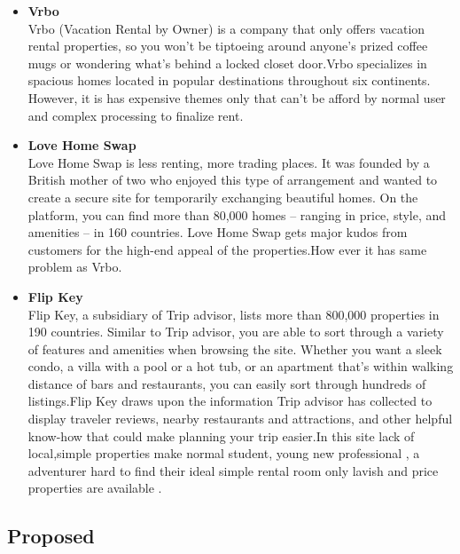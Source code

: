 \begin{itemize}
    \item \textbf{Vrbo}\\
    Vrbo (Vacation Rental by Owner) is a company that only offers vacation rental properties, so you won’t be tiptoeing around anyone’s prized coffee mugs or wondering what’s behind a locked closet door.Vrbo specializes in spacious homes located in popular destinations throughout six continents. However, it is has expensive themes only that can't be afford by normal user and complex processing to finalize rent.
    \item \textbf{Love Home Swap}\\
  Love Home Swap is less renting, more trading places. It was founded by a British mother of two who enjoyed this type of arrangement and wanted to create a secure site for temporarily exchanging beautiful homes. On the platform, you can find more than 80,000 homes – ranging in price, style, and amenities – in 160 countries. Love Home Swap gets major kudos from customers for the high-end appeal of the properties.How ever it has same problem as Vrbo.\\

    \item \textbf{Flip Key}\\
    Flip Key, a subsidiary of Trip advisor, lists more than 800,000 properties in 190 countries. Similar to Trip advisor, you are able to sort through a variety of features and amenities when browsing the site. Whether you want a sleek condo, a villa with a pool or a hot tub, or an apartment that’s within walking distance of bars and restaurants, you can easily sort through hundreds of listings.Flip Key draws upon the information Trip advisor has collected to display traveler reviews, nearby restaurants and attractions, and other helpful know-how that could make planning your trip easier.In this site lack of local,simple properties make normal student, young new professional , a adventurer hard to find their ideal simple rental room only lavish and price properties are available  .
\end{itemize}
\vspace{0.5in}
\subsection{Proposed}

